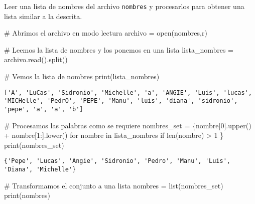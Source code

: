 \documentclass[
  letterpaper,
  DIV=11,
  numbers=noendperiod]{scrreprt}
\newenvironment{Shaded}{\begin{snugshade}}{\end{snugshade}}
\newcommand{\BuiltInTok}[1]{\textcolor[rgb]{0.00,0.23,0.31}{#1}}
\newcommand{\CommentTok}[1]{\textcolor[rgb]{0.37,0.37,0.37}{#1}}
\newcommand{\ControlFlowTok}[1]{\textcolor[rgb]{0.00,0.23,0.31}{#1}}
\newcommand{\DecValTok}[1]{\textcolor[rgb]{0.68,0.00,0.00}{#1}}
\newcommand{\KeywordTok}[1]{\textcolor[rgb]{0.00,0.23,0.31}{#1}}
\newcommand{\NormalTok}[1]{\textcolor[rgb]{0.00,0.23,0.31}{#1}}
\newcommand{\OperatorTok}[1]{\textcolor[rgb]{0.37,0.37,0.37}{#1}}
\newcommand{\StringTok}[1]{\textcolor[rgb]{0.13,0.47,0.30}{#1}}
\begin{document}
Leer una lista de nombres del archivo \texttt{nombres} y procesarlos
para obtener una lista similar a la descrita.

\begin{Shaded}
\begin{Highlighting}[]
\CommentTok{\# Abrimos el archivo en modo lectura}
\NormalTok{archivo }\OperatorTok{=} \BuiltInTok{open}\NormalTok{(}\StringTok{\textquotesingle{}nombres\textquotesingle{}}\NormalTok{,}\StringTok{\textquotesingle{}r\textquotesingle{}}\NormalTok{)}

\CommentTok{\# Leemos la lista de nombres y los ponemos en una lista}
\NormalTok{lista\_nombres }\OperatorTok{=}\NormalTok{ archivo.read().split()}

\CommentTok{\# Vemos la lista de nombres}
\BuiltInTok{print}\NormalTok{(lista\_nombres)}
\end{Highlighting}
\end{Shaded}

\begin{verbatim}
['A', 'LuCas', 'Sidronio', 'Michelle', 'a', 'ANGIE', 'Luis', 'lucas', 'MICHelle', 'PedrO', 'PEPE', 'Manu', 'luis', 'diana', 'sidronio', 'pepe', 'a', 'a', 'b']
\end{verbatim}

\begin{Shaded}
\begin{Highlighting}[]
\CommentTok{\# Procesamos las palabras como se requiere}
\NormalTok{nombres\_set }\OperatorTok{=}\NormalTok{ \{nombre[}\DecValTok{0}\NormalTok{].upper() }\OperatorTok{+}\NormalTok{ nombre[}\DecValTok{1}\NormalTok{:].lower() }
                     \ControlFlowTok{for}\NormalTok{ nombre }\KeywordTok{in}\NormalTok{ lista\_nombres }
                     \ControlFlowTok{if} \BuiltInTok{len}\NormalTok{(nombre) }\OperatorTok{\textgreater{}} \DecValTok{1}\NormalTok{ \}}
\BuiltInTok{print}\NormalTok{(nombres\_set)}
\end{Highlighting}
\end{Shaded}

\begin{verbatim}
{'Pepe', 'Lucas', 'Angie', 'Sidronio', 'Pedro', 'Manu', 'Luis', 'Diana', 'Michelle'}
\end{verbatim}

\begin{Shaded}
\begin{Highlighting}[]
\CommentTok{\# Transformamos el conjunto a una lista}
\NormalTok{nombres }\OperatorTok{=} \BuiltInTok{list}\NormalTok{(nombres\_set)}
\BuiltInTok{print}\NormalTok{(nombres)}
\end{Highlighting}
\end{Shaded}
\end{document}
